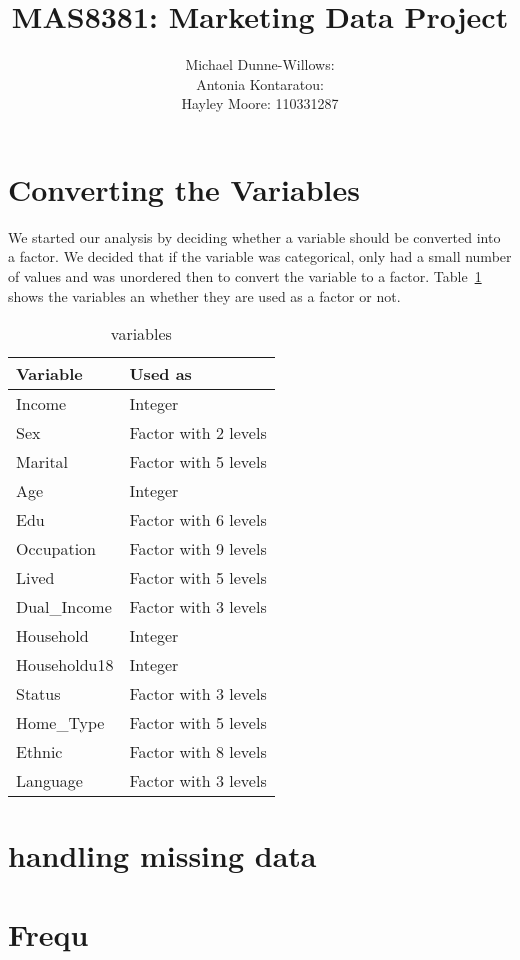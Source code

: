 \documentclass{article}
\begin{document}
\title{MAS8381: Marketing Data Project}
\author{Michael Dunne-Willows:\\
Antonia Kontaratou:\\
Hayley Moore: 110331287}
\maketitle

\section{Converting the Variables}
We started our analysis by deciding whether a variable should be converted into a factor. We decided that if the variable was categorical, only had a small number of values and was unordered then to convert the variable to a factor. Table~\ref{variables} shows the variables an whether they are used as a factor or not.
\begin{table}[H]
\centering
\begin{tabular}{|l|l|}
\hline
\textbf{Variable} &\textbf{Used as}\\
\hline
Income       &Integer  \\
Sex          &Factor with 2 levels \\
Marital      &Factor with 5 levels \\
Age          &Integer  \\
Edu          &Factor with 6 levels\\
Occupation   &Factor with 9 levels\\
Lived        &Factor with 5 levels\\
Dual\_Income &Factor with 3 levels\\
Household    &Integer  \\
Householdu18 &Integer  \\
Status       &Factor with 3 levels \\
Home\_Type   &Factor with 5 levels \\
Ethnic       &Factor with 8 levels \\
Language     &Factor with 3 levels \\
\hline
\end{tabular}
\caption{variables}
\label{variables}
\end{table}
\section{handling missing data}
\section{Frequ}
\end{document}
